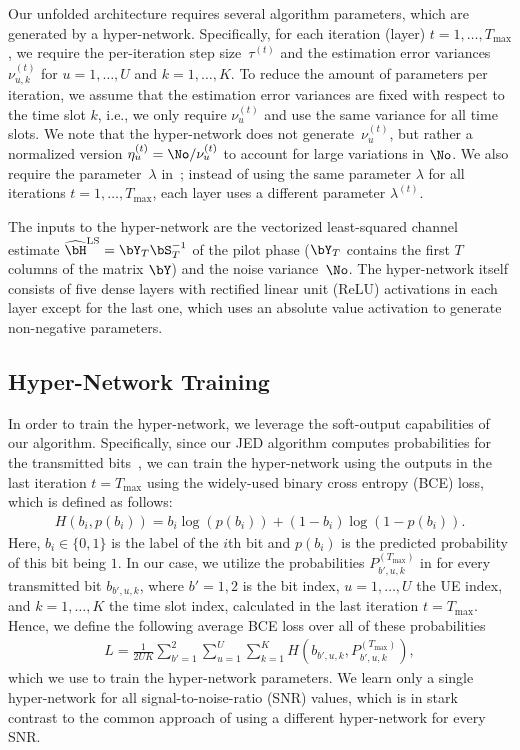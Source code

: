 Our unfolded architecture requires several algorithm parameters, which are generated by a hyper-network. 
%
Specifically, for each iteration (layer) $t=1,\ldots,T_\text{max}$, we require the per-iteration step size~$\tau^{(t)}$ and the estimation error variances $\nu_{u,k}^{(t)}$ for $u=1,\ldots,U$ and $k=1,\ldots,K$.
%
To reduce the amount of parameters per iteration, we assume that the estimation error variances are fixed with respect to the time slot $k$, i.e., we only require $\nu_{u}^{(t)}$ and use the same variance for all time slots. 
%
We note that the hyper-network does not generate~$\nu_{u}^{(t)}$, but rather a normalized version $\eta_{u}^{(t)} = {\No}/{\nu_{u}^{(t)}}$ to account for large variations in $\No$. 
%
We also require the parameter~$\lambda$ in~; instead of using the same parameter $\lambda$ for all iterations $t=1,\ldots,T_\text{max}$, each layer uses a different parameter $\lambda^{(t)}$. 

The inputs to the hyper-network are the vectorized least-squared channel estimate $\widehat\bH^{\text{LS}} = \bY_T\bS_T^{-1}$ of the pilot phase ($\bY_T$ contains the first $T$ columns of the matrix $\bY$) and the  noise variance~$\No$. 
%
The hyper-network itself consists of five dense layers with rectified linear unit (ReLU) activations in each layer except for the last one, which uses an absolute value activation to generate non-negative parameters. 


\subsection{Hyper-Network Training}\label{sec:hypernetwork training}
%
In order to train the hyper-network, we leverage the soft-output capabilities of our algorithm.
%
Specifically, since our JED algorithm computes probabilities for the transmitted bits~, we can train the hyper-network using the outputs in the last iteration $t=T_\text{max}$ using the widely-used binary cross entropy (BCE) loss, which is defined as follows: 
\begin{align}\label{eq:bce canonical}
 H(b_i,p(b_i)) =  b_i \log(p(b_i)) + (1-b_i)\log(1-p(b_i)).
\end{align}
Here, $b_i\in\{0,1\}$ is the label of the $i$th bit and $p(b_i)$ is the predicted probability of this bit being $1$.
%
In our case, we utilize the probabilities $P_{b',u,k}^{(T_\text{max})}$ in  for every transmitted bit $b_{b',u,k}$, where $b'=1,2$ is the bit index, $u=1,\ldots,U$ the UE index, and  $k=1,\ldots,K$ the time slot index, calculated in the last iteration $t=T_\text{max}$. 
%
Hence, we define the following average BCE loss over all of these probabilities
%
\begin{align}\label{eq:loss function}
L = \frac{1}{2UK}\sum_{b'=1}^{2}\sum_{u=1}^{U}\sum_{k=1}^{K} H\!\left(b_{b',u,k},P_{b',u,k}^{(T_\text{max})}\right)\!,
\end{align}
which we use to train the hyper-network parameters. We learn only a single hyper-network for all signal-to-noise-ratio (SNR) values, which is in stark contrast to the common approach of using a different hyper-network for every SNR. 
 